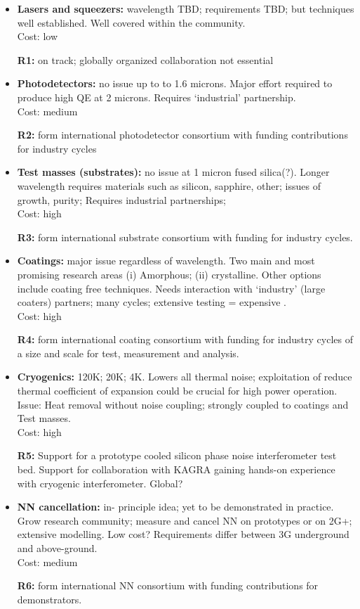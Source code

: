 \begin{itemize}

\item \noindent \textbf{Lasers and squeezers:}  wavelength TBD; requirements TBD; but techniques well established. 
 Well covered within the community.\\    Cost:  low 

\textbf{R1:}  on track; globally organized collaboration not essential

\item \noindent \textbf{Photodetectors:}  no issue up to to 1.6 microns.  Major effort required to produce high QE at 2 microns.  Requires `industrial' partnership. \\ Cost:  medium

\textbf{R2:}  form international photodetector consortium with funding contributions for industry cycles

\item \noindent \textbf{Test masses (substrates): } no issue at 1 micron fused silica(?).  Longer wavelength requires materials such as silicon, sapphire, other;  issues of growth, purity;  Requires industrial partnerships; \\ 
Cost:  high

\textbf{R3:}  form international substrate consortium with funding for industry cycles.

\item \noindent \textbf{Coatings: }major issue regardless of wavelength.  Two main and most promising research areas (i) Amorphous; (ii) crystalline.  Other options include coating free techniques.  Needs interaction with `industry' (large coaters) partners; many cycles; extensive testing = expensive .\\   
Cost:  high

\textbf{R4:}  form international coating consortium with funding for industry cycles of a size and scale for test, measurement and analysis.

\item \noindent \textbf{Cryogenics:}  120K; 20K; 4K.  Lowers all thermal noise; exploitation of reduce thermal coefficient of expansion could be crucial for high power operation.  Issue: Heat removal without noise coupling; strongly coupled to coatings and Test masses.\\     
Cost: high

\textbf{R5:} Support for a prototype cooled silicon phase noise interferometer test bed. Support for collaboration with KAGRA gaining hands-on experience with cryogenic interferometer. Global?


\item \noindent \textbf{NN cancellation: } in- principle idea; yet to be demonstrated in practice. Grow research community; measure and cancel NN on prototypes or on 2G+; extensive modelling. Low cost? Requirements differ between 3G underground and above-ground. \\     
Cost:  medium

\textbf{R6:}  form international NN consortium with funding contributions for  demonstrators.

\end{itemize}


